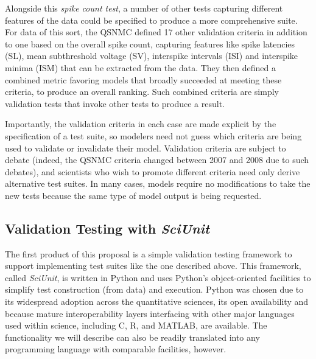\documentclass[11pt,letterpaper]{article}
\begin{document}
Alongside this \emph{spike count test}, a number of other tests capturing different features of the data could be specified to produce a more comprehensive suite. For data of this sort, the QSNMC defined 17 other validation criteria in addition to one based on the overall spike count, capturing features like spike latencies (SL), mean subthreshold voltage (SV), interspike intervals (ISI) and interspike minima (ISM) that can be extracted from the data\cite{jolivet_quantitative_2008}. They then defined a combined metric favoring models that broadly succeeded at meeting these criteria, to produce an overall ranking. Such combined criteria are simply validation tests that invoke other tests to produce a result.

Importantly, the validation criteria in each case are made explicit by the specification of a test suite, so modelers need not guess which criteria are being used to validate or invalidate their model. Validation criteria are subject to debate (indeed, the QSNMC criteria changed between 2007 and 2008 due to such debates), and scientists who wish to promote different criteria need only derive alternative test suites. In many cases, models require no modifications to take the new tests because the same type of model output is being requested.

\subsection{Validation Testing with \emph{SciUnit}} 
The first product of this proposal is a simple validation testing framework to support implementing test suites like the one described above. This framework, called \emph{SciUnit}, is written in Python \cite{python_url} and uses Python's object-oriented facilities to simplify test construction (from data) and execution\cite{python_oo_url}. Python was chosen due to its widespread adoption across the quantitative sciences, its open availability and because mature interoperability layers interfacing with other major languages used within science, including C\cite{python_ctypes_url}, R\cite{r_url}, and MATLAB\cite{matlab_url}, are available. The functionality we will describe can also be readily translated into any programming language with comparable facilities, however.

\end{document}
